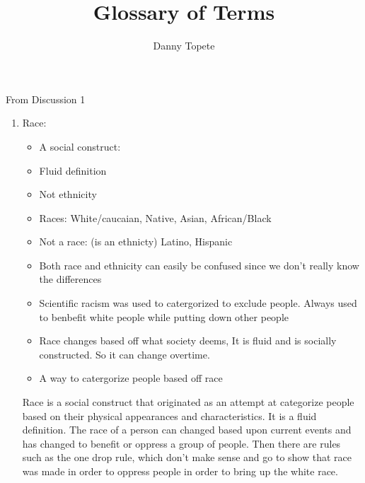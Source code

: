 \documentclass{article}
\title{Glossary of Terms}
\author{Danny Topete}
\begin{document}
  
\maketitle

From Discussion 1
\begin{enumerate}
  \item Race:
    \begin{itemize}
      \item A social construct:
      \item Fluid  definition
      \item Not ethnicity
      \item Races:
        White/caucaian, Native, Asian, African/Black
      \item Not a race: (is an ethnicty)
        Latino, Hispanic
      \item Both race and ethnicity can easily be confused since we don't 
        really know the differences
      \item Scientific racism was used to catergorized
        to exclude people.
        Always used to benbefit white people while putting
        down other people
      \item Race changes based off what society deems,
        It is fluid and is socially constructed. 
        So it can change overtime.
      \item A way to catergorize people based off race
    \end{itemize}
    Race is a social construct that originated
    as an attempt at categorize people 
    based on their physical appearances and
    characteristics. It is a fluid definition.
    The race of a person can changed based
    upon current events and has changed
    to benefit or oppress a group of people.
    Then there are rules such as the one drop rule,
    which don't make sense and go to show
    that race was made in order to oppress people
    in order to bring up the white race.


\end{enumerate}
\end{document}
